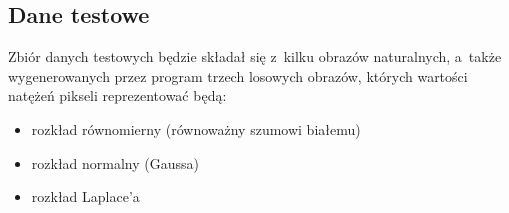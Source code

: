 \subsection{Dane testowe}
\label{subsec:dane_testowe}

Zbiór danych testowych będzie składał się z~kilku obrazów naturalnych, a~także wygenerowanych przez program trzech losowych obrazów, których wartości natężeń pikseli reprezentować będą:

\begin{itemize} \itemsep1pt
	\item rozkład równomierny (równoważny szumowi białemu)
	\item rozkład normalny (Gaussa)
	\item rozkład Laplace'a
\end{itemize}




